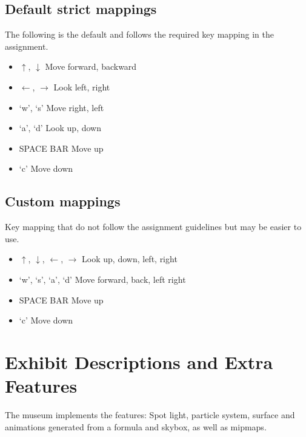 \documentclass[10pt, oneside]{article}   	%
\begin{document}
\subsection{Default strict mappings}
The following is the default and follows the required key mapping in the assignment.
\begin{itemize}
\item $\uparrow$, $\downarrow$ Move forward, backward
\item $\leftarrow$, $\rightarrow$ Look left, right
\item `w', `s' Move right, left
\item `a', `d' Look up, down
\item SPACE BAR Move up
\item `c' Move down
\end{itemize}

\subsection{Custom mappings}
Key mapping that do not follow the assignment guidelines but may be easier to use.
\begin{itemize}   %
\item $\uparrow$, $\downarrow$, $\leftarrow$, $\rightarrow$ Look up, down, left, right
\item `w', `s', `a', `d' Move forward, back, left right
\item SPACE BAR Move up
\item `c' Move down
\end{itemize}


\section{Exhibit Descriptions and Extra Features}
The museum implements the features: Spot light, particle system, surface and animations generated from a formula and skybox, as well as mipmaps.
\end{document}
